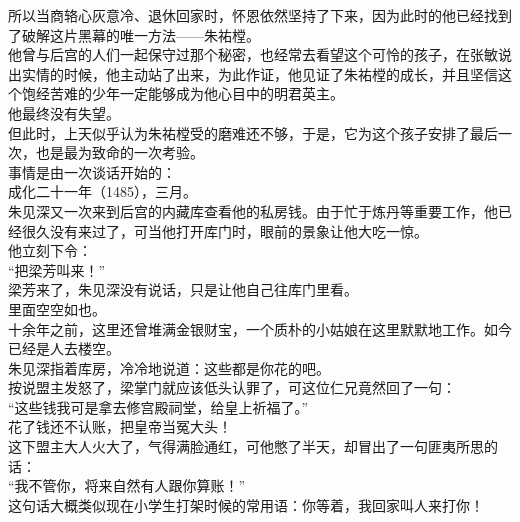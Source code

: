 \begin{multicols}{\theparacolNo}
所以当商辂心灰意冷、退休回家时，怀恩依然坚持了下来，因为此时的他已经找到了破解这片黑幕的唯一方法——朱祐樘。\\

他曾与后宫的人们一起保守过那个秘密，也经常去看望这个可怜的孩子，在张敏说出实情的时候，他主动站了出来，为此作证，他见证了朱祐樘的成长，并且坚信这个饱经苦难的少年一定能够成为他心目中的明君英主。\\

他最终没有失望。\\

但此时，上天似乎认为朱祐樘受的磨难还不够，于是，它为这个孩子安排了最后一次，也是最为致命的一次考验。\\

事情是由一次谈话开始的：\\

成化二十一年（1485），三月。\\

朱见深又一次来到后宫的内藏库查看他的私房钱。由于忙于炼丹等重要工作，他已经很久没有来过了，可当他打开库门时，眼前的景象让他大吃一惊。\\

他立刻下令：\\

“把梁芳叫来！”\\

梁芳来了，朱见深没有说话，只是让他自己往库门里看。\\

里面空空如也。\\

十余年之前，这里还曾堆满金银财宝，一个质朴的小姑娘在这里默默地工作。如今已经是人去楼空。\\

朱见深指着库房，冷冷地说道：这些都是你花的吧。\\

按说盟主发怒了，梁掌门就应该低头认罪了，可这位仁兄竟然回了一句：\\

“这些钱我可是拿去修宫殿祠堂，给皇上祈福了。”\\

花了钱还不认账，把皇帝当冤大头！\\

这下盟主大人火大了，气得满脸通红，可他憋了半天，却冒出了一句匪夷所思的话：\\

“我不管你，将来自然有人跟你算账！”\\

这句话大概类似现在小学生打架时候的常用语：你等着，我回家叫人来打你！\\


\end{multicols}
